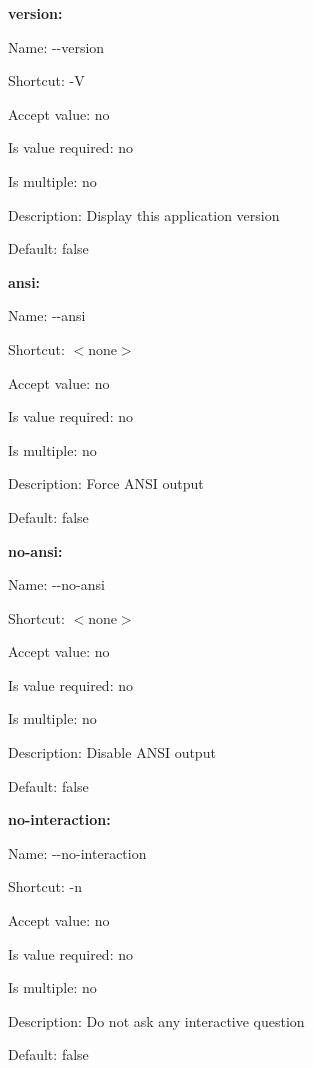 {\bfseries version\+:}


\begin{DoxyItemize}
\item Name\+: {\ttfamily -\/-\/version}
\item Shortcut\+: {\ttfamily -\/\+V}
\item Accept value\+: no
\item Is value required\+: no
\item Is multiple\+: no
\item Description\+: Display this application version
\item Default\+: {\ttfamily false}
\end{DoxyItemize}

{\bfseries ansi\+:}


\begin{DoxyItemize}
\item Name\+: {\ttfamily -\/-\/ansi}
\item Shortcut\+: $<$none$>$
\item Accept value\+: no
\item Is value required\+: no
\item Is multiple\+: no
\item Description\+: Force A\+N\+S\+I output
\item Default\+: {\ttfamily false}
\end{DoxyItemize}

{\bfseries no-\/ansi\+:}


\begin{DoxyItemize}
\item Name\+: {\ttfamily -\/-\/no-\/ansi}
\item Shortcut\+: $<$none$>$
\item Accept value\+: no
\item Is value required\+: no
\item Is multiple\+: no
\item Description\+: Disable A\+N\+S\+I output
\item Default\+: {\ttfamily false}
\end{DoxyItemize}

{\bfseries no-\/interaction\+:}


\begin{DoxyItemize}
\item Name\+: {\ttfamily -\/-\/no-\/interaction}
\item Shortcut\+: {\ttfamily -\/n}
\item Accept value\+: no
\item Is value required\+: no
\item Is multiple\+: no
\item Description\+: Do not ask any interactive question
\item Default\+: {\ttfamily false} 
\end{DoxyItemize}